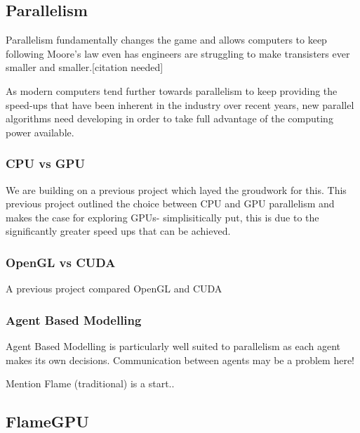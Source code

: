 \documentclass{UoYCSproject}
\begin{document}
\subsection{Parallelism}

Parallelism fundamentally changes the game and allows computers to keep following Moore's law even has engineers are struggling to make transisters ever smaller and smaller.[citation needed]

As modern computers tend further towards parallelism to keep providing the speed-ups that have been inherent in the industry over recent years, new parallel algorithms need developing in order to take full advantage of the computing power available. 

\subsubsection{CPU vs GPU}
We are building on a previous project\cite{phil_diss} which layed the groudwork for this.
This previous project outlined the choice between CPU and GPU parallelism and makes the case for exploring GPUs- simplisitically put, this is due to the significantly greater speed ups that can be achieved.




\subsubsection{OpenGL vs CUDA}
A previous project compared OpenGL and CUDA


\subsubsection{Agent Based Modelling}
Agent Based Modelling is particularly well suited to parallelism as each agent makes its own decisions.
Communication between agents may be a problem here!


Mention Flame (traditional) is a start..

\subsection{FlameGPU}
\end{document}
